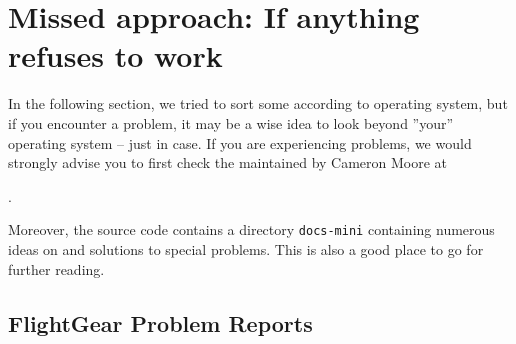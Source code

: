 
\chapter{Missed approach: If anything refuses to work\label{missed}}

In the following section, we tried to sort some  according to operating system,
but if you encounter a problem, it may be a wise idea to look beyond ''your'' operating system -- just in case. If you are experiencing problems, we would strongly advise you to first check the  maintained by Cameron Moore at
\medskip

.
\medskip


Moreover, the source code contains a directory \texttt{docs-mini} containing numerous
ideas on and solutions to special problems. This is also a good place to go for further reading.

\section{FlightGear Problem Reports}

